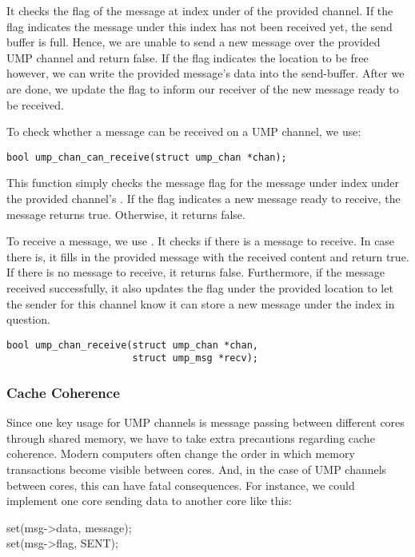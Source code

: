 It checks the flag of the message at index  under  of the provided channel. If the flag indicates the message under this index has not been received yet, the send buffer is full. Hence, we are unable to send a new message over the provided UMP channel and return false. If the flag indicates the location to be free however, we can write the provided message's data into the send-buffer. After we are done, we update the flag to inform our receiver of the new message ready to be received.


To check whether a message can be received on a UMP channel, we use:
\begin{mdframed}[style=myframe]
\begin{verbatim}
bool ump_chan_can_receive(struct ump_chan *chan);
\end{verbatim}
\end{mdframed}

This function simply checks the message flag for the message under index  under the provided channel's . If the flag indicates a new message ready to receive, the message returns true. Otherwise, it returns false.


To receive a message, we use . It checks if there
is a message to receive. In case there is, it fills in the provided message with the received
content and return true. If there is no message to receive, it returns false. Furthermore, if the message received successfully, it also updates the flag under the provided location to let the sender for this channel know it can store a new message under the index in question.
\begin{mdframed}[style=myframe]
\begin{verbatim}
bool ump_chan_receive(struct ump_chan *chan,
                      struct ump_msg *recv);
\end{verbatim}
\end{mdframed}

\subsubsection{Cache Coherence} \label{barriers}
Since one key usage for UMP channels is message passing between different cores through shared memory, we have to take extra precautions regarding cache coherence. Modern computers often change the order in which memory transactions become visible between cores. And, in the case of UMP channels between cores, this can have fatal consequences. For instance, we could implement one core sending data to another core like this:
\begin{mdframed}[style=algorithm]
\begin{algorithm}[H]
set(msg->data, message);\\
set(msg->flag, SENT);
\end{algorithm}
\end{mdframed}

